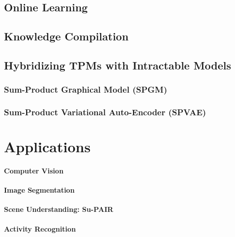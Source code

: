 		\subsection{Online Learning} %

		\subsection{Knowledge Compilation} %

		\subsection{Hybridizing TPMs with Intractable Models} %

			\subsubsection{Sum-Product Graphical Model (SPGM)} %

			\subsubsection{Sum-Product Variational Auto-Encoder (SPVAE)} %

	\section{Applications} %

		\paragraph{Computer Vision} %

		\paragraph{Image Segmentation} %

		\paragraph{Scene Understanding: Su-PAIR} %

		\paragraph{Activity Recognition} %

